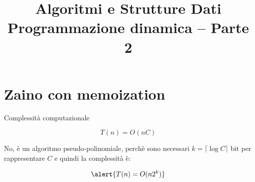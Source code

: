 

\usepackage{epigraph}
\usepackage[normalem]{ulem}
\usepackage{xcolor}
\usepackage{colortbl}
\usepackage{tikz}
\usepackage[normalem]{ulem}
\usepackage[absolute,overlay]{textpos}
\usetikzlibrary{trees}
\usetikzlibrary{shapes}
\usetikzlibrary{positioning}

\setlength{\epigraphwidth}{6cm}

\usepackage{xmpmulti}
\usepackage{listings}


\newcommand*\circled[1]{\tikz[baseline=(char.base)]{
      \node[circle,ball color=blue, shade, 
 color=white,inner sep=1.2pt] (char) {\tiny #1};}}


\title[ASD - Programmazione Dinamica]{\textbf{Algoritmi e Strutture Dati}\\[24pt]Programmazione dinamica -- Parte 2}

\graphicspath{{figs/13/}}





\FrameTitle{}

\FrameContent

\section{Zaino con memoization}

\begin{frame}[fragile]{Complessità computazionale}


\[ 
  T(n) = O(nC)
\]


\medskip
No, è un algoritmo \alert{pseudo-polinomiale}, perchè sono necessari \alert{$k = \lceil \log C \rceil$} bit
per rappresentare $C$ e quindi la complessità è:

\[
  \alert{T(n) = O(n 2^k) }
\]

\end{frame}


